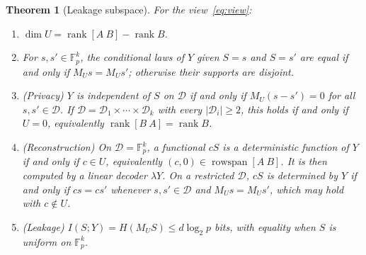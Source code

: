 \documentclass[pdflatex,sn-mathphys-num,twocolumn]{sn-jnl}
\theoremstyle{plain}
\newtheorem{theorem}{Theorem}
\theoremstyle{definition}
\newcommand{\F}{\mathbb{F}}
\newcommand{\rk}{\operatorname{rank}}
\begin{document}
\begin{keyresult}
\begin{theorem}[Leakage subspace]\label{thm:leakage}
For the view~\eqref{eq:view}:
\begin{enumerate}
\item $\dim U=\rk[A\ B]-\rk B$.
\item For $s,s'\in\F_p^k$, the conditional laws of $Y$ given $S=s$ and $S=s'$ are equal if and only if $M_Us=M_Us'$; otherwise their supports are disjoint.
\item (Privacy) $Y$ is independent of $S$ on $\mathcal D$ if and only if $M_U(s-s')=0$ for all $s,s'\in \mathcal D$. If $\mathcal D=\mathcal D_1\times\cdots\times \mathcal D_k$ with every $|\mathcal D_i|\ge2$, this holds if and only if $U=0$, equivalently $\rk[B\ A]=\rk B$.
\item (Reconstruction) On $\mathcal D=\F_p^k$, a functional $cS$ is a deterministic function of $Y$ if and only if $c\in U$, equivalently $(c,0)\in\operatorname{rowspan}[A\ B]$. It is then computed by a linear decoder $\lambda Y$. On a restricted $\mathcal D$, $cS$ is determined by $Y$ if and only if $cs=cs'$ whenever $s,s'\in \mathcal D$ and $M_Us=M_Us'$, which may hold with $c\notin U$.
\item (Leakage) $I(S;Y)=H(M_US)\le d\log_2p$ bits, with equality when $S$ is uniform on $\F_p^k$.
\end{enumerate}
\end{theorem}
\end{keyresult}
\end{document}
